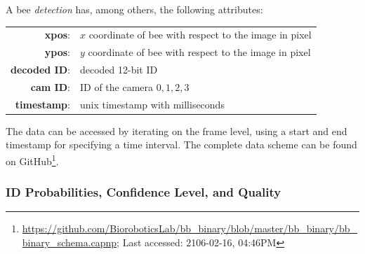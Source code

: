 A bee \emph{detection} has, among others, the following attributes:

\begin{table}[!h]
\centering
\begin{tabular}{rl}
\textbf{xpos}: & $x$ coordinate of bee with respect to the image in pixel \\
\textbf{ypos}: & $y$ coordinate of bee with respect to the image in pixel \\
\textbf{decoded ID}: & decoded 12-bit ID \\
\textbf{cam ID}: & ID of the camera ${0,1,2,3}$ \\
\textbf{timestamp}: & unix timestamp with milliseconds\\
\end{tabular}
\end{table}

The data can be accessed by iterating on the frame level, using a start and end time\-stamp for specifying a time interval. The complete data scheme can be found on GitHub\footnote{\url{https://github.com/BioroboticsLab/bb_binary/blob/master/bb_binary/bb_binary_schema.capnp}; Last accessed: 2106-02-16, 04:46PM}. 


\subsubsection{ID Probabilities, Confidence Level, and Quality}
\label{subsec:confidence}

